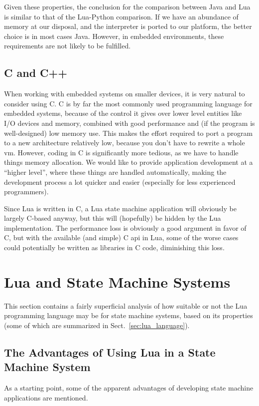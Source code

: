 Given these properties, the conclusion for the comparison between Java and Lua is similar to that of the Lua-Python comparison. If we have an abundance of memory at our disposal, and the interpreter is ported to our platform, the better choice is in most cases Java. However, in embedded environments, these requirements are not likely to be fulfilled.

\subsection{C and C++}
\label{sec:lua_vs_c}
When working with embedded systems on smaller devices, it is very natural to consider using C. C is by far the most commonly used programming language for embedded systems, because of the control it gives over lower level entities like I/O devices and memory, combined with good performance and (if the program is well-designed) low memory use. This makes the effort required to port a program to a new architecture relatively low, because you don't have to rewrite a whole \gls{vm}. However, coding in C is significantly more tedious, as we have to handle things memory allocation. We would like to provide application development at a ``higher level'', where these things are handled automatically, making the development process a lot quicker and easier (especially for less experienced programmers).

Since Lua is written in C, a Lua state machine application will obviously be largely C-based anyway, but this will (hopefully) be hidden by the Lua implementation. The performance loss is obviously a good argument in favor of C, but with the available (and simple) C \gls{api} in Lua, some of the worse cases could potentially be written as libraries in C code, diminishing this loss.

\section{Lua and State Machine Systems}
\label{sec:lua_and_state_machines}
This section contains a fairly superficial analysis of how suitable or not the Lua programming language may be for state machine systems, based on its properties (some of which are summarized in Sect.~\ref{sec:lua_language}).

\subsection{The Advantages of Using Lua in a State Machine System}
\label{sec:lua_advantages}
As a starting point, some of the apparent advantages of developing state machine applications are mentioned.


